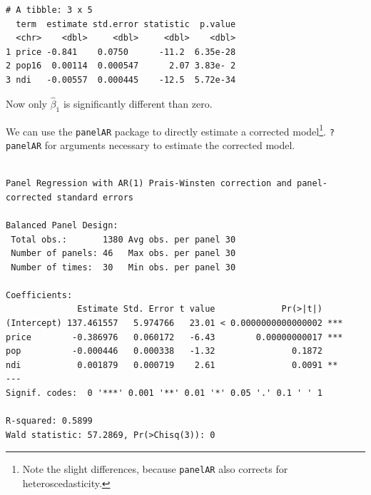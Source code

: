 \documentclass[]{book}
\newenvironment{Shaded}{\begin{snugshade}}{\end{snugshade}}
\newcommand{\DataTypeTok}[1]{\textcolor[rgb]{0.13,0.29,0.53}{#1}}
\newcommand{\KeywordTok}[1]{\textcolor[rgb]{0.13,0.29,0.53}{\textbf{#1}}}
\newcommand{\NormalTok}[1]{#1}
\newcommand{\OperatorTok}[1]{\textcolor[rgb]{0.81,0.36,0.00}{\textbf{#1}}}
\newcommand{\StringTok}[1]{\textcolor[rgb]{0.31,0.60,0.02}{#1}}
\let\rmarkdownfootnote\footnote%
\def\footnote{\protect\rmarkdownfootnote}
\begin{document}
\begin{Shaded}
\end{Shaded}

\begin{verbatim}
# A tibble: 3 x 5
  term  estimate std.error statistic  p.value
  <chr>    <dbl>     <dbl>     <dbl>    <dbl>
1 price -0.841    0.0750      -11.2  6.35e-28
2 pop16  0.00114  0.000547      2.07 3.83e- 2
3 ndi   -0.00557  0.000445    -12.5  5.72e-34
\end{verbatim}

Now only \(\hat\beta_1\) is significantly different than zero.

We can use the \texttt{panelAR} package to directly estimate a corrected model\footnote{Note the slight differences, because \texttt{panelAR} also corrects for heteroscedasticity.}. \texttt{?panelAR} for arguments necessary to estimate the corrected model.

\begin{Shaded}
\end{Shaded}

\begin{verbatim}

Panel Regression with AR(1) Prais-Winsten correction and panel-corrected standard errors

Balanced Panel Design:                                             
 Total obs.:       1380 Avg obs. per panel 30
 Number of panels: 46   Max obs. per panel 30
 Number of times:  30   Min obs. per panel 30

Coefficients:
              Estimate Std. Error t value             Pr(>|t|)    
(Intercept) 137.461557   5.974766   23.01 < 0.0000000000000002 ***
price        -0.386976   0.060172   -6.43        0.00000000017 ***
pop          -0.000446   0.000338   -1.32               0.1872    
ndi           0.001879   0.000719    2.61               0.0091 ** 
---
Signif. codes:  0 '***' 0.001 '**' 0.01 '*' 0.05 '.' 0.1 ' ' 1

R-squared: 0.5899
Wald statistic: 57.2869, Pr(>Chisq(3)): 0
\end{verbatim}
\end{document}
